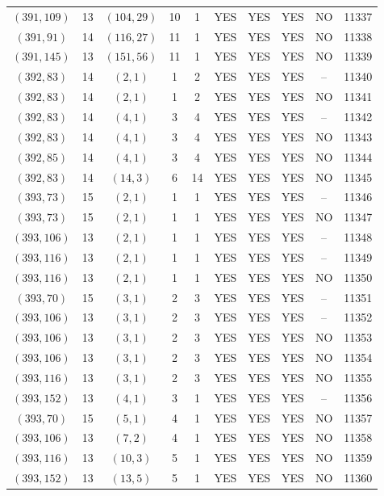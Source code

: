 \begin{longtable}{|c|c|c|c|c|c|c|c|c|c|}
$(391, 109)$ & 13 & $(104, 29)$ & 10 & 1 & YES & YES & YES & NO & 11337\\
$(391, 91)$ & 14 & $(116, 27)$ & 11 & 1 & YES & YES & YES & NO & 11338\\
$(391, 145)$ & 13 & $(151, 56)$ & 11 & 1 & YES & YES & YES & NO & 11339\\
$(392, 83)$ & 14 & $(2, 1)$ & 1 & 2 & YES & YES & YES & -- & 11340\\
$(392, 83)$ & 14 & $(2, 1)$ & 1 & 2 & YES & YES & YES & NO & 11341\\
$(392, 83)$ & 14 & $(4, 1)$ & 3 & 4 & YES & YES & YES & -- & 11342\\
$(392, 83)$ & 14 & $(4, 1)$ & 3 & 4 & YES & YES & YES & NO & 11343\\
$(392, 85)$ & 14 & $(4, 1)$ & 3 & 4 & YES & YES & YES & NO & 11344\\
$(392, 83)$ & 14 & $(14, 3)$ & 6 & 14 & YES & YES & YES & NO & 11345\\
$(393, 73)$ & 15 & $(2, 1)$ & 1 & 1 & YES & YES & YES & -- & 11346\\
$(393, 73)$ & 15 & $(2, 1)$ & 1 & 1 & YES & YES & YES & NO & 11347\\
$(393, 106)$ & 13 & $(2, 1)$ & 1 & 1 & YES & YES & YES & -- & 11348\\
$(393, 116)$ & 13 & $(2, 1)$ & 1 & 1 & YES & YES & YES & -- & 11349\\
$(393, 116)$ & 13 & $(2, 1)$ & 1 & 1 & YES & YES & YES & NO & 11350\\
$(393, 70)$ & 15 & $(3, 1)$ & 2 & 3 & YES & YES & YES & -- & 11351\\
$(393, 106)$ & 13 & $(3, 1)$ & 2 & 3 & YES & YES & YES & -- & 11352\\
$(393, 106)$ & 13 & $(3, 1)$ & 2 & 3 & YES & YES & YES & NO & 11353\\
$(393, 106)$ & 13 & $(3, 1)$ & 2 & 3 & YES & YES & YES & NO & 11354\\
$(393, 116)$ & 13 & $(3, 1)$ & 2 & 3 & YES & YES & YES & NO & 11355\\
$(393, 152)$ & 13 & $(4, 1)$ & 3 & 1 & YES & YES & YES & -- & 11356\\
$(393, 70)$ & 15 & $(5, 1)$ & 4 & 1 & YES & YES & YES & NO & 11357\\
$(393, 106)$ & 13 & $(7, 2)$ & 4 & 1 & YES & YES & YES & NO & 11358\\
$(393, 116)$ & 13 & $(10, 3)$ & 5 & 1 & YES & YES & YES & NO & 11359\\
$(393, 152)$ & 13 & $(13, 5)$ & 5 & 1 & YES & YES & YES & NO & 11360\\

\end{longtable}
